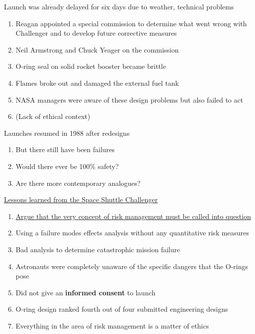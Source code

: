 \documentclass[aspectratio=1610,pdftex,dvipsnames,compress,xcolor={dvipsnames}]{beamer}
\begin{document}
\begin{frame}{Launch was already delayed for six days due to weather, technical problems}
    \begin{enumerate}[series=outerlist,topsep=0pt,itemsep=21pt,leftmargin=*,label=(\arabic*)]
        \item[]Reagan appointed a special commission to determine what went wrong with Challenger and to develop future corrective measures  
        \item[]Neil Armstrong and Chuck Yeager on the commission
        \item[]O-ring seal on solid rocket booster became brittle  
        \item[]Flames broke out and damaged the external fuel tank  
        \item[]NASA managers were aware of these design problems but also failed to act  
        \item[](Lack of ethical context)
    \end{enumerate}
\end{frame}


\begin{frame}{Launches resumed in 1988 after redesigns}
    \begin{enumerate}[series=outerlist,topsep=0pt,itemsep=21pt,leftmargin=*,label=(\arabic*)]
        \item[]But there still have been failures  
        \item[]Would there ever be 100\% safety?
        \item[]Are there more contemporary analogues?
    \end{enumerate}
\end{frame}


\begin{frame}{\href{https://uidaho.pressbooks.pub/riskassessment/chapter/contemporary-cases-in-risk-assessment-2/}{Lessons learned from the Space Shuttle Challenger}}
    \begin{enumerate}[series=outerlist,topsep=0pt,itemsep=15pt,leftmargin=*,label=(\arabic*)]
        \item[]\href{https://uidaho.pressbooks.pub/riskassessment/chapter/contemporary-cases-in-risk-assessment/}{Argue that the very concept of risk management must be called into question}  
        \item[]Using a failure modes effects analysis without any quantitative risk measures
        \item[]Bad analysis to determine catastrophic mission failure
        \item[]Astronauts were completely unaware of the specific dangers that the O-rings pose  
        \item[]Did not give an \textbf{informed consent} to launch
        \item[]O-ring design ranked fourth out of four submitted engineering designs
        \item[]Everything in the area of risk management is a matter of ethics
    \end{enumerate}
\end{frame}
\end{document}
